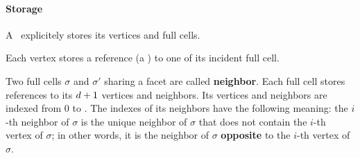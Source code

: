 {{\paragraph{Storage}

A \tds\ explicitely stores its vertices and full cells.

Each vertex stores a reference (a ) to one of its incident
full cell.

Two  full cells $\sigma$ and $\sigma'$ sharing a facet are called
\textbf{neighbor}.
Each full cell stores references to its $d+1$ vertices and
neighbors. Its vertices and neighbors are indexed from $0$ to \cd. The indexes
of its neighbors have the following meaning: the $i$-th neighbor of $\sigma$
is the unique neighbor of $\sigma$ that does not contain the $i$-th vertex of
$\sigma$; in other words, it is the neighbor of $\sigma$ \textbf{opposite} to
the $i$-th vertex of $\sigma$.

}}
